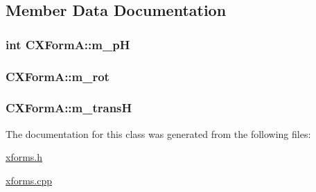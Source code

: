 \subsection{Member Data Documentation}
\hypertarget{classCXFormA_a16303dc5004f2f1edb244ca3def93632}{
\subsubsection[{m\-\_\-p\-H}]{\setlength{\rightskip}{0pt plus 5cm}int C\-X\-Form\-A\-::m\-\_\-p\-H\hspace{0.3cm}{\ttfamily [protected]}}}\label{classCXFormA_a16303dc5004f2f1edb244ca3def93632}
\hypertarget{classCXFormA_a5f1e8d96f4058a4a79bc7bae850cd8db}{
\subsubsection[{m\-\_\-rot}]{ C\-X\-Form\-A\-::m\-\_\-rot\hspace{0.3cm}{\ttfamily [protected]}}}\label{classCXFormA_a5f1e8d96f4058a4a79bc7bae850cd8db}
\hypertarget{classCXFormA_aded42876441ed8f86434fc69c4bbb266}{
\subsubsection[{m\-\_\-trans\-H}]{ C\-X\-Form\-A\-::m\-\_\-trans\-H\hspace{0.3cm}{\ttfamily [protected]}}}\label{classCXFormA_aded42876441ed8f86434fc69c4bbb266}


The documentation for this class was generated from the following files\-:\begin{DoxyCompactItemize}
\item 
\hyperlink{xforms_8h}{xforms.\-h}\item 
\hyperlink{xforms_8cpp}{xforms.\-cpp}\end{DoxyCompactItemize}
